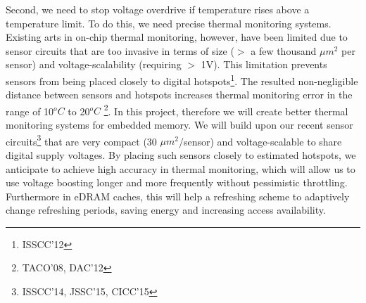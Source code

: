 Second, we need to stop voltage overdrive if temperature rises above a temperature limit. To do this, we need precise thermal monitoring systems. Existing arts in on-chip thermal monitoring, however, have been limited due to sensor circuits that are too invasive in terms of size ($>$ a few thousand $\mu m^2$ per sensor) and voltage-scalability (requiring $>$ 1V). This limitation prevents sensors from being placed closely to digital hotspots\footnote{ISSCC’12}. The resulted non-negligible distance between sensors and hotspots increases thermal monitoring error in the range of 10$^oC$ to 20$^oC$ \footnote{TACO’08, DAC'12}. In this project, therefore we will create better thermal monitoring systems for embedded memory. We will build upon our recent sensor circuits\footnote{ISSCC’14, JSSC’15, CICC’15} that are very compact (30 $\mu m^2$/sensor) and voltage-scalable to share digital supply voltages. By placing such sensors closely to estimated hotspots, we anticipate to achieve high accuracy in thermal monitoring, which will allow us to use voltage boosting longer and more frequently without pessimistic throttling. Furthermore in eDRAM caches, this will help a refreshing scheme to adaptively change refreshing periods, saving energy and increasing access availability. 

